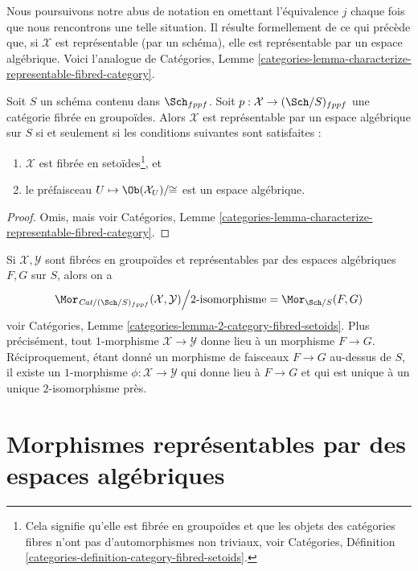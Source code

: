 \noindent
Nous poursuivons notre abus de notation en omettant l'équivalence $j$
chaque fois que nous rencontrons une telle situation.
Il résulte formellement de ce qui précède que, si $\mathcal{X}$ est
représentable (par un schéma), elle est représentable par un
espace algébrique. Voici l'analogue de
Catégories,
Lemme \ref{categories-lemma-characterize-representable-fibred-category}.

\begin{lemma}
\label{lemma-characterize-representable-by-space}
Soit $S$ un schéma contenu dans $\Sch_{fppf}$.
Soit $p : \mathcal{X} \to (\Sch/S)_{fppf}$
une catégorie fibrée en groupoïdes.
Alors $\mathcal{X}$ est représentable par un espace algébrique sur $S$
si et seulement si les conditions suivantes sont satisfaites :
\begin{enumerate}
\item $\mathcal{X}$ est fibrée en setoïdes\footnote{Cela signifie qu'elle
est fibrée en groupoïdes et que les objets des catégories fibres
n'ont pas d'automorphismes non triviaux, voir Catégories,
Définition \ref{categories-definition-category-fibred-setoids}.}, et
\item le préfaisceau $U \mapsto \Ob(\mathcal{X}_U)/\!\!\cong$ est
un espace algébrique.
\end{enumerate}
\end{lemma}

\begin{proof}
Omis, mais voir Catégories,
Lemme \ref{categories-lemma-characterize-representable-fibred-category}.
\end{proof}

\noindent
Si $\mathcal{X}, \mathcal{Y}$ sont fibrées en groupoïdes et
représentables par des espaces algébriques $F, G$ sur $S$, alors on a
\begin{equation}
\label{equation-morphisms-spaces}
\Mor_{\textit{Cat}/(\Sch/S)_{fppf}}(\mathcal{X}, \mathcal{Y})
\Big/
2\text{-isomorphisme}
=
\Mor_{\Sch/S}(F, G)
\end{equation}
voir
Catégories, Lemme \ref{categories-lemma-2-category-fibred-setoids}.
Plus précisément, tout $1$-morphisme $\mathcal{X} \to \mathcal{Y}$
donne lieu à un morphisme $F \to G$. Réciproquement, étant donné un morphisme
de faisceaux $F \to G$ au-dessus de $S$, il existe un $1$-morphisme
$\phi : \mathcal{X} \to \mathcal{Y}$ qui donne lieu à $F \to G$
et qui est unique à un unique $2$-isomorphisme près.



\section{Morphismes représentables par des espaces algébriques}
\label{section-morphisms-representable-by-algebraic-spaces}


